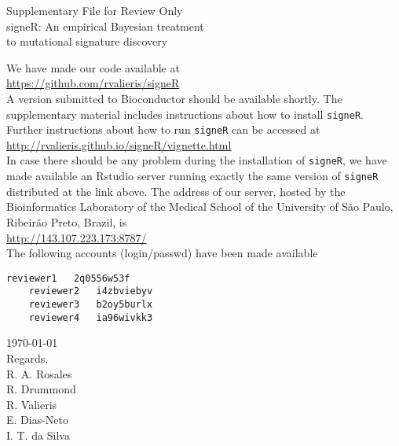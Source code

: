 \documentclass[12pt]{article}
\begin{document}
\begin{center}

{\large\sc Supplementary File for Review Only}\\[2em]

{\large signeR: An empirical Bayesian treatment\\ to mutational
  signature discovery}\\[2em]
\end{center}

We have made our code available at\\
\indent \url{https://github.com/rvalieris/signeR}\\
A version submitted to Bioconductor should be available shortly. The
supplementary material includes instructions about how to install
\texttt{signeR}. Further instructions about how to run \texttt{signeR}
can be accessed at\\
\indent \url{http://rvalieris.github.io/signeR/vignette.html}\\

In case there should be any problem during the installation of
\texttt{signeR}, we have made available an Rstudio server running
exactly the same version of \texttt{signeR} distributed at the link
above. The address of our server, hosted by the Bioinformatics
Laboratory of the Medical School of the University of S\~{a}o Paulo,
Ribeir\~{a}o Preto, Brazil, is\\ 
\indent \url{http://143.107.223.173:8787/}\\
The following accounts (login/passwd) have been made available\\[-0.5em]
\begin{lstlisting}[]
    reviewer1   2q0556w53f
    reviewer2   i4zbviebyv
    reviewer3   b2oy5burlx
    reviewer4   ia96wivkk3
\end{lstlisting}


\vspace{1cm}

\hfill\today\\

\noindent Regards,\\[0.75em]
R. A. Rosales\\
R. Drummond\\
R. Valieris\\
E. Dias-Neto\\
I. T. da Silva
\end{document}

